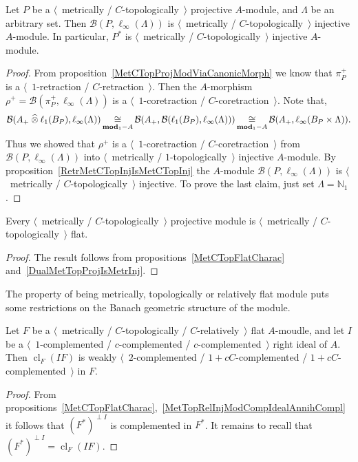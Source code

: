 \begin{proposition}\label{DualMetTopProjIsMetrInj} Let $P$ be a
$\langle$~metrically / $C$-topologically~$\rangle$ projective $A$-module, and
$\Lambda$ be an arbitrary set. Then $\mathcal{B}(P,\ell_\infty(\Lambda))$ is
$\langle$~metrically / $C$-topologically~$\rangle$ injective $A$-module. In
particular, $P^*$ is $\langle$~metrically / $C$-topologically~$\rangle$
injective $A$-module.
\end{proposition}
\begin{proof} From proposition~\ref{MetCTopProjModViaCanonicMorph} we know 
that $\pi_P^+$ is a $\langle$~$1$-retraction / $C$-retraction~$\rangle$. 
Then the $A$-morphism
$\rho^+=\mathcal{B}(\pi_P^+,\ell_\infty(\Lambda))$ is a
$\langle$~$1$-coretraction / $C$-coretraction~$\rangle$. Note that, 
$$
\mathcal{B}(A_+\mathbin{\widehat{\otimes}}\ell_1(B_P),\ell_\infty(\Lambda))
\mathop{\mathbin{\cong}}\limits_{\mathbf{mod}_1-A}
\mathcal{B}(A_+,\mathcal{B}(\ell_1(B_P),\ell_\infty(\Lambda)))
\mathop{\mathbin{\cong}}\limits_{\mathbf{mod}_1-A}
\mathcal{B}(A_+,\ell_\infty(B_P\times\Lambda)).
$$ 
Thus we showed that $\rho^+$ is a $\langle$~$1$-coretraction /
$C$-coretraction~$\rangle$ from $\mathcal{B}(P,\ell_\infty(\Lambda))$ into
$\langle$~metrically / $1$-topologically~$\rangle$ injective $A$-module. By
proposition~\ref{RetrMetCTopInjIsMetCTopInj} the $A$-module
$\mathcal{B}(P,\ell_\infty(\Lambda))$ is $\langle$~metrically /
$C$-topologically~$\rangle$ injective. To prove the last claim, just set
$\Lambda=\mathbb{N}_1$.
\end{proof}

\begin{proposition}\label{MetTopProjIsMetTopFlat} Every $\langle$~metrically /
$C$-topologically~$\rangle$ projective module is $\langle$~metrically /
$C$-topologically~$\rangle$ flat.
\end{proposition}
\begin{proof} The result follows from propositions~\ref{MetCTopFlatCharac}
and~\ref{DualMetTopProjIsMetrInj}.
\end{proof}

The property of being metrically, topologically or relatively flat module 
puts some restrictions on the Banach geometric structure of the module.

\begin{proposition}\label{MetTopRelFlatModCompIdealPartCompl} Let $F$ 
be a $\langle$~metrically / $C$-topologically / $C$-relatively~$\rangle$ 
flat $A$-moudle, and let $I$ 
be a $\langle$~$1$-complemented / $c$-complemented / $c$-complemented~$\rangle$
right ideal of $A$. Then $\operatorname{cl}_F(I F)$ 
is weakly $\langle$~$2$-complemented / $1+cC$-complemented / 
$1+cC$-complemented~$\rangle$  in $F$.
\end{proposition}
\begin{proof} From 
propositions~\ref{MetCTopFlatCharac},~\ref{MetTopRelInjModCompIdealAnnihCompl} 
it follows that ${(F^*)}^{\perp I}$ is complemented in $F^*$. It remains to 
recall that ${(F^*)}^{\perp I}=\operatorname{cl}_F(I F)$. 
\end{proof}

